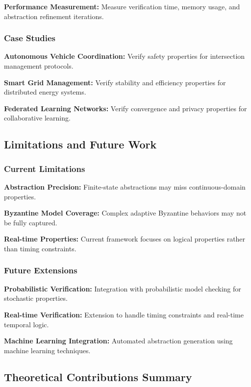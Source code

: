 \documentclass[conference]{IEEEtran}
\begin{document}
\textbf{Performance Measurement:} Measure verification time, memory usage, and abstraction refinement iterations.

\subsubsection{Case Studies}

\textbf{Autonomous Vehicle Coordination:} Verify safety properties for intersection management protocols.

\textbf{Smart Grid Management:} Verify stability and efficiency properties for distributed energy systems.

\textbf{Federated Learning Networks:} Verify convergence and privacy properties for collaborative learning.

\subsection{Limitations and Future Work}

\subsubsection{Current Limitations}

\textbf{Abstraction Precision:} Finite-state abstractions may miss continuous-domain properties.

\textbf{Byzantine Model Coverage:} Complex adaptive Byzantine behaviors may not be fully captured.

\textbf{Real-time Properties:} Current framework focuses on logical properties rather than timing constraints.

\subsubsection{Future Extensions}

\textbf{Probabilistic Verification:} Integration with probabilistic model checking for stochastic properties.

\textbf{Real-time Verification:} Extension to handle timing constraints and real-time temporal logic.

\textbf{Machine Learning Integration:} Automated abstraction generation using machine learning techniques.

\subsection{Theoretical Contributions Summary}
\end{document}
